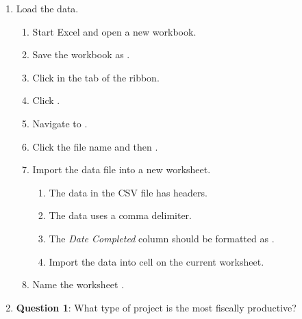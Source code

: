 \begin{enumerate}
	\item Load the data.

	\begin{enumerate}
		\item Start Excel and open a new workbook.
		\item Save the workbook as .
		\item Click  in the  tab of the ribbon.
		\item Click . 
		\item Navigate to .
		\item Click the file name and then .
		\item Import the data file into a new worksheet.
	
		\begin{enumerate}
			\item The data in the CSV file has headers.
			\item The data uses a comma delimiter.
			\item The \textit{Date Completed} column should be formatted as .
			\item Import the data into cell  on the current worksheet.
		\end{enumerate}
	
		\item Name the worksheet .

	\end{enumerate}

	\item{\textbf{Question 1}: What type of project is the most fiscally productive?}


\end{enumerate}
